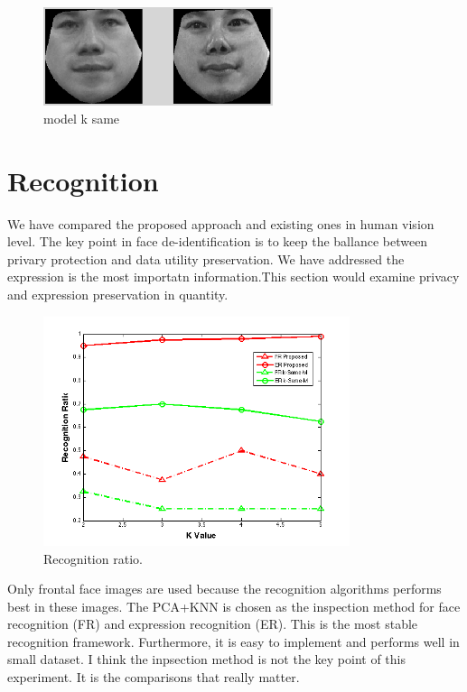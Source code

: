 		\begin{figure}[!htb]
		  \centering
		  \includegraphics[width=0.6\textwidth]{figure/good_MkS}
		  \caption{model k same}
		  \label{fig:model_result}
		\end{figure}

\section{Recognition}

We have compared the proposed approach and existing ones in human vision level. The key point in face de-identification is to keep the ballance between privary protection and data utility preservation. We have addressed the expression is the most importatn information.This section would examine privacy and expression preservation in quantity.
	
	
	\begin{figure}[!htb]
	  \centering
	  \includegraphics[width=0.8\textwidth]{figure/plotPic}
	  \caption{Recognition ratio.}
	  \label{fig:plotPic}
	\end{figure}

	Only frontal face images are used because the recognition algorithms performs best in these images. The PCA+KNN is chosen as the inspection method for face recognition (FR) and expression recognition (ER). This is the most stable recognition framework. Furthermore, it is easy to implement and performs well in small dataset. I think the inpsection method is not the key point of this experiment. It is the comparisons that really matter. 

